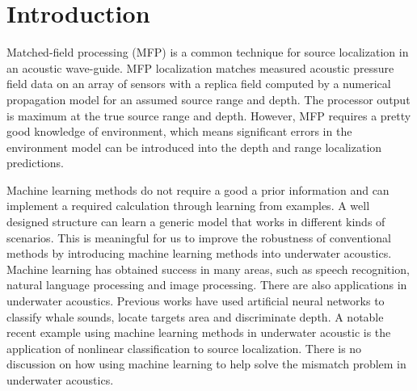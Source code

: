 \section{Introduction}
Matched-field processing (MFP) is a common technique for source localization in an acoustic
wave-guide\cite{bucker1976use,baggeroer1988matched,baggeroer1993overview}.
MFP localization matches measured acoustic pressure field data on an array of sensors with a replica field computed by a numerical propagation model for an assumed source range and depth. The processor output is maximum at the true source range and depth. However, MFP requires a pretty good knowledge of environment, which means significant errors in the environment model can be introduced into the
depth and range localization predictions\cite{tolstoy1989sensitivity,del1988effects}.

Machine learning methods do not require a good a prior information and can implement a required calculation through learning from examples. A well designed structure can learn a generic model that works in different kinds of scenarios. This is meaningful for us to improve the robustness of conventional methods by introducing machine learning methods into underwater acoustics.
Machine learning  has obtained success in many areas, such as speech recognition, natural language processing and image processing. There are also applications in underwater acoustics.
Previous works have used artificial neural networks to classify whale sounds\cite{thode2012automated}, locate targets area\cite{steinberg1991neural} and discriminate depth\cite{ozard1991artificial}.
A notable recent example using machine learning methods in underwater acoustic is the application of nonlinear classification to source localization\cite{niu2017source}. There is no discussion on how using machine learning to help solve the mismatch problem in underwater acoustics.

